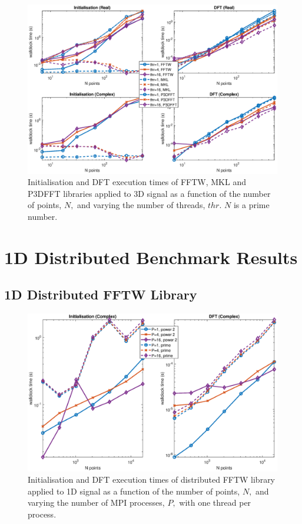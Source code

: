 \documentclass[a4paper]{article}
\begin{document}
\begin{figure}[htb]
    \centering
    \includegraphics[width=\linewidth]{../results/fftw_mkl_p3dfft_prime_3d_thr.eps}
  \caption{Initialisation and DFT execution times of FFTW, MKL and P3DFFT libraries applied to 3D signal as a function of the
    number of points, $N,$ and varying the number of threads, $thr.$ $N$ is a prime number.}
  \label{3DFFTWMKLPrime}
\end{figure}




\section{1D Distributed Benchmark Results}\label{Sec:1DDistr}


\subsection{1D Distributed FFTW Library}\label{Sec:1DDistFFTW}

\begin{figure}[htb]
    \centering
    \includegraphics[width=\linewidth]{../results/fftw_1d_mpi.eps}
  \caption{Initialisation and DFT execution times of distributed FFTW library applied to 1D signal as a function of the
    number of points, $N,$ and varying the number of MPI processes, $P,$ with one thread per process.}
  \label{1DDistFFTW}
\end{figure}
\end{document}
